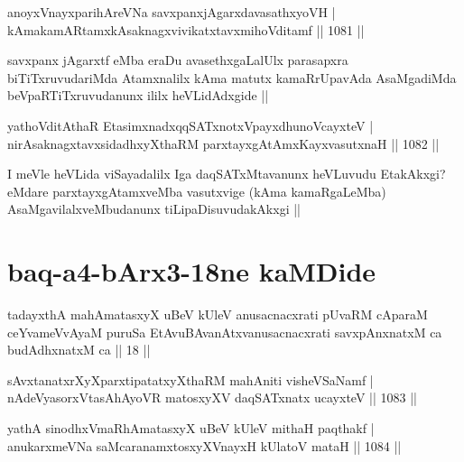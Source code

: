 
\begin{shl}
anoyxVnayxparihAreVNa savxpanxjAgarxdavasathxyoVH | \\
kAmakamARtamxkAsaknagxvivikatxtavxmihoVditamf \hfill||  1081 ||  
\end{shl}

\begin{artha}
savxpanx jAgarxtf eMba eraDu avasethxgaLalUlx parasapxra biTiTxruvudariMda Atamxnalilx kAma matutx kamaRrUpavAda AsaMgadiMda beVpaRTiTxruvudanunx ililx heVLidAdxgide ||
\end{artha}

\begin{shl}
yathoVditAthaR EtasimxnadxqqSATxnotxV\s payxdhunoVcayxteV | \\
nirAsaknagxtavxsidadhxyXthaRM parxtayxgAtAmxKayxvasutxnaH \hfill ||  1082 ||  
\end{shl}

\begin{artha}
I meVle heVLida viSayadalilx Iga daqSATxMtavanunx heVLuvudu EtakAkxgi? eMdare parxtayxgAtamxveMba vasutxvige (kAma kamaRgaLeMba) AsaMgavilalxveMbudanunx tiLipaDisuvudakAkxgi ||
\end{artha}

\section*{baq-a4-bArx3-18ne kaMDide}

\begin{shl}
tadayxthA mahAmatasxyX uBeV kUleV anusacnacxrati pUvaRM cAparaM ceYvameVvAyaM puruSa EtAvuBAvanAtxvanusacnacxrati savxpAnxnatxM ca budAdhxnatxM ca || 18 ||
\end{shl}



\begin{shl}
sAvxtanatxrXyXparxtipatatxyXthaRM mahAniti visheVSaNamf | \\
nAdeVyasorxVtasA\s hAyoVR matosxyXV daqSATxnatx ucayxteV \hfill||  1083 ||  
\end{shl}
				
\begin{shl}
yathA sinodhxVmaRhAmatasxyX uBeV kUleV mithaH paqthakf | \\
anukarxmeVNa saMcaranamxtosxyXV\s nayxH kUlatoV mataH \hfill||  1084 ||  
\end{shl}

